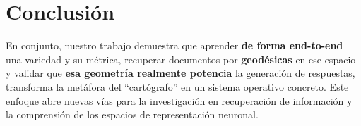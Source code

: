 \section{Conclusión}
En conjunto, nuestro trabajo demuestra que aprender \textbf{de forma end-to-end} una variedad y su métrica, recuperar documentos por \textbf{geodésicas} en ese espacio y validar que \textbf{esa geometría realmente potencia} la generación de respuestas, transforma la metáfora del “cartógrafo” en un sistema operativo concreto. Este enfoque abre nuevas vías para la investigación en recuperación de información y la comprensión de los espacios de representación neuronal.

